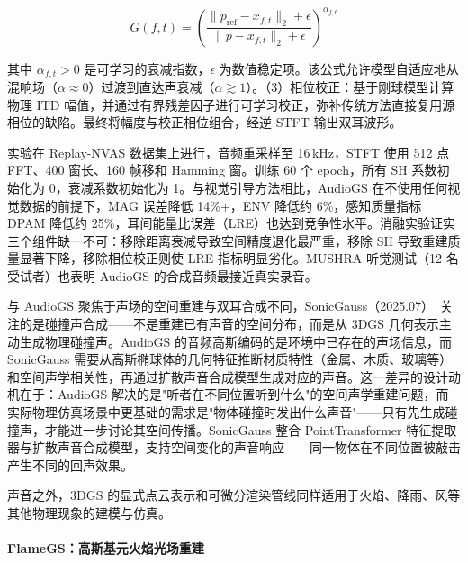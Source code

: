 \begin{equation}
G(f,t) = \left( \frac{\|p_{\text{ref}} - x_{f,t}\|_2 + \epsilon}{\|p - x_{f,t}\|_2 + \epsilon} \right)^{\!\alpha_{f,t}}
\end{equation}

其中 $\alpha_{f,t} > 0$ 是可学习的衰减指数，$\epsilon$ 为数值稳定项。该公式允许模型自适应地从混响场（$\alpha \approx 0$）过渡到直达声衰减（$\alpha \gtrsim 1$）。（3）相位校正：基于刚球模型计算物理 ITD 幅值，并通过有界残差因子进行可学习校正，弥补传统方法直接复用源相位的缺陷。最终将幅度与校正相位组合，经逆 STFT 输出双耳波形。

实验在 Replay-NVAS 数据集上进行，音频重采样至 16\,kHz，STFT 使用 512 点 FFT、400 窗长、160 帧移和 Hamming 窗。训练 60 个 epoch，所有 SH 系数初始化为 0，衰减系数初始化为 1。与视觉引导方法相比，AudioGS 在不使用任何视觉数据的前提下，MAG 误差降低 14\%+，ENV 降低约 6\%，感知质量指标 DPAM 降低约 25\%，耳间能量比误差（LRE）也达到竞争性水平。消融实验证实三个组件缺一不可：移除距离衰减导致空间精度退化最严重，移除 SH 导致重建质量显著下降，移除相位校正则使 LRE 指标明显劣化。MUSHRA 听觉测试（12 名受试者）也表明 AudioGS 的合成音频最接近真实录音。

与 AudioGS 聚焦于声场的空间重建与双耳合成不同，SonicGauss（2025.07）~\cite{2507_19835}关注的是碰撞声合成——不是重建已有声音的空间分布，而是从 3DGS 几何表示主动生成物理碰撞声。AudioGS 的音频高斯编码的是环境中已存在的声场信息，而 SonicGauss 需要从高斯椭球体的几何特征推断材质特性（金属、木质、玻璃等）和空间声学相关性，再通过扩散声音合成模型生成对应的声音。这一差异的设计动机在于：AudioGS 解决的是"听者在不同位置听到什么"的空间声学重建问题，而实际物理仿真场景中更基础的需求是"物体碰撞时发出什么声音"——只有先生成碰撞声，才能进一步讨论其空间传播。SonicGauss 整合 PointTransformer 特征提取器与扩散声音合成模型，支持空间变化的声音响应——同一物体在不同位置被敲击产生不同的回声效果。

声音之外，3DGS 的显式点云表示和可微分渲染管线同样适用于火焰、降雨、风等其他物理现象的建模与仿真。

\paragraph{FlameGS：高斯基元火焰光场重建}

